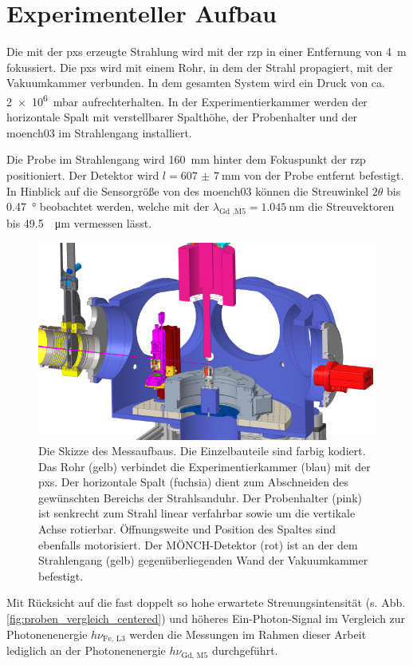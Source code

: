 \chapter{Experimenteller Aufbau}
Die mit der \gls{pxs} erzeugte Strahlung wird mit der \gls{rzp} in einer Entfernung von \SI{4}{\meter} fokussiert. Die \gls{pxs} wird mit einem Rohr, in dem der Strahl propagiert, mit der Vakuumkammer verbunden. In dem gesamten System wird ein Druck von ca. \SI{2e6}{\milli\bar} aufrechterhalten. In der Experimentierkammer werden der horizontale Spalt mit verstellbarer Spalthöhe, der Probenhalter und der \gls{moench03} im Strahlengang installiert.

\noindent
Die Probe im Strahlengang wird \SI{160}{\milli\meter} hinter dem Fokuspunkt der \gls{rzp} positioniert. Der Detektor wird $l = \SI{607(7)}{\milli\meter}$ von der Probe entfernt befestigt. In Hinblick auf die Sensorgröße von  des \gls{moench03} können die Streuwinkel $2\theta$ bis \SI{0.47}{\degree} beobachtet werden, welche mit der $\lambda_\text{Gd ,M5} = \SI{1.045}{\nano\meter}$ die Streuvektoren bis \SI{49,5}{\per\micro\meter} vermessen lässt.
\begin{figure}[H]
    \centering
    \includegraphics{images/aufbau/aufbau_empty.pdf}
    \caption{Die Skizze des Messaufbaus. Die Einzelbauteile sind farbig kodiert. Das Rohr (gelb) verbindet die Experimentierkammer (blau) mit der \gls{pxs}. Der horizontale Spalt (fuchsia) dient zum Abschneiden des gewünschten Bereichs der Strahlsanduhr. Der Probenhalter (pink) ist senkrecht zum Strahl linear verfahrbar sowie um die vertikale Achse rotierbar. Öffnungsweite und Position des Spaltes sind ebenfalls motorisiert. Der MÖNCH-Detektor (rot) ist an der dem Strahlengang (gelb) gegenüberliegenden Wand der Vakuumkammer befestigt.}
    \label{fig:anlage}
\end{figure}
\noindent
Mit Rücksicht auf die fast doppelt so hohe erwartete Streuungsintensität (s. Abb. \ref{fig:proben_vergleich_centered}) und höheres Ein-Photon-Signal im Vergleich zur Photonenenergie $h\nu_\text{Fe, L3}$ werden die Messungen im Rahmen dieser Arbeit lediglich an der Photonenenergie $h\nu_\text{Gd, M5}$ durchgeführt.

